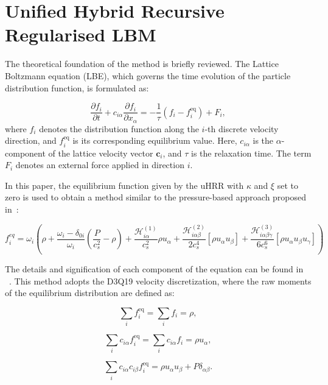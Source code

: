 \chapter{Unified Hybrid Recursive Regularised LBM}
\label{uHRR-LBM}

The theoretical foundation of the method is briefly reviewed. The Lattice Boltzmann equation (LBE), which governs the time evolution of the particle distribution function, is formulated as:

\begin{equation}
    \frac{\partial f_i}{\partial t} + c_{i\alpha} \frac{\partial f_i}{\partial x_{\alpha}} = -\frac{1}{\tau}(f_i - f_i^{\mathrm{eq}}) + F_i,
\end{equation}
where $f_i$ denotes the distribution function along the $i$-th discrete velocity direction, and $f_i^{\mathrm{eq}}$ is its corresponding equilibrium value. Here, $c_{i\alpha}$ is the $\alpha$-component of the lattice velocity vector $\mathbf{c}_i$, and $\tau$ is the relaxation time. The term $F_i$ denotes an external force applied in direction $i$.

In this paper, the equilibrium function given by the uHRR with \(\kappa\) and \(\xi\) set to zero is used to obtain a method similar to the pressure-based approach proposed in~\cite{farag2020pressure}:

\begin{equation}
    f_i^{eq} = \omega_i\left( \rho + \frac{\omega_i-\delta_{0i}}{\omega_i}(\frac{P}{c_s^2}-\rho) + \frac{\mathcal{H}_{i\alpha}^{(1)}}{c_s^2} \rho u_\alpha + \frac{\mathcal{H}_{i\alpha\beta}^{(2)}}{2c_s^4}[\rho u_\alpha u_\beta] + \frac{\mathcal{H}_{i\alpha\beta\gamma}^{(3)}}{6c_s^6}[\rho u_\alpha u_\beta u_\gamma] \right)
\end{equation}

The details and signification of each component of the equation can be found in ~\cite{farag2021unified}. This method adopts the D3Q19 velocity discretization, where the raw moments of the equilibrium distribution are defined as:

\begin{equation}
    \sum_i f_i^{\mathrm{eq}} = \sum_i f_i = \rho,
\end{equation}

\begin{equation}
    \sum_i c_{i\alpha} f_i^{\mathrm{eq}} = \sum_i c_{i\alpha} f_i = \rho u_{\alpha},
\end{equation}

\begin{equation}
    \sum_i c_{i\alpha} c_{i\beta} f_i^{\mathrm{eq}} = \rho u_{\alpha} u_{\beta} + P \delta_{\alpha\beta}.
\end{equation}

